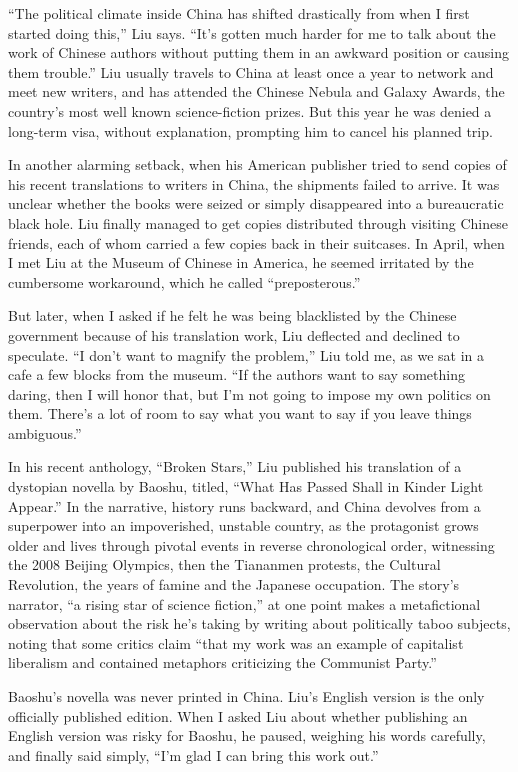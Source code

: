 ``The political climate inside China has shifted drastically from when I
first started doing this,'' Liu says. ``It's gotten much harder for me
to talk about the work of Chinese authors without putting them in an
awkward position or causing them trouble.'' Liu usually travels to China
at least once a year to network and meet new writers, and has attended
the Chinese Nebula and Galaxy Awards, the country's most well known
science-fiction prizes. But this year he was denied a long-term visa,
without explanation, prompting him to cancel his planned trip.

In another alarming setback, when his American publisher tried to send
copies of his recent translations to writers in China, the shipments
failed to arrive. It was unclear whether the books were seized or simply
disappeared into a bureaucratic black hole. Liu finally managed to get
copies distributed through visiting Chinese friends, each of whom
carried a few copies back in their suitcases. In April, when I met Liu
at the Museum of Chinese in America, he seemed irritated by the
cumbersome workaround, which he called ``preposterous.''

But later, when I asked if he felt he was being blacklisted by the
Chinese government because of his translation work, Liu deflected and
declined to speculate. ``I don't want to magnify the problem,'' Liu told
me, as we sat in a cafe a few blocks from the museum. ``If the authors
want to say something daring, then I will honor that, but I'm not going
to impose my own politics on them. There's a lot of room to say what you
want to say if you leave things ambiguous.''

In his recent anthology, ``Broken Stars,'' Liu published his translation
of a dystopian novella by Baoshu, titled, ``What Has Passed Shall in
Kinder Light Appear.'' In the narrative, history runs backward, and
China devolves from a superpower into an impoverished, unstable country,
as the protagonist grows older and lives through pivotal events in
reverse chronological order, witnessing the 2008 Beijing Olympics, then
the Tiananmen protests, the Cultural Revolution, the years of famine and
the Japanese occupation. The story's narrator, ``a rising star of
science fiction,'' at one point makes a metafictional observation about
the risk he's taking by writing about politically taboo subjects, noting
that some critics claim ``that my work was an example of capitalist
liberalism and contained metaphors criticizing the Communist Party.''

Baoshu's novella was never printed in China. Liu's English version is
the only officially published edition. When I asked Liu about whether
publishing an English version was risky for Baoshu, he paused, weighing
his words carefully, and finally said simply, ``I'm glad I can bring
this work out.''

